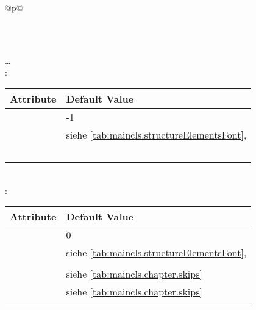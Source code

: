   \begin{longtable}{@{}p{\columnwidth}@{}}
    \caption{Default of the headings of  and
      }%
    \label{tab:maincls.section.defaults}\\
    \endfirsthead
    \caption[]{Default of the headings of  and
       \emph{(Continuation)}}\\
    \addlinespace[-\normalbaselineskip]
    \endhead
    \raggedleft\dots\\
    \endfoot
    \endlastfoot
    : \\*
    \begin{tabularx}{\linewidth}{ll}
    \toprule
    Attribute & Default Value \\
    \midrule
    \PValue{level}       & -1 \\
    \PValue{font}        & siehe \autoref{tab:maincls.structureElementsFont}, 
                           \autopageref{tab:maincls.structureElementsFont} \\
    \PValue{indent}      & \PValue{0pt} \\
    \PValue{beforeskip}  & \PValue{0pt plus 1fil + \Length{baselineskip}} \\
    \PValue{afterskip}   & \PValue{0pt plus 1fil} \\
    \PValue{tocindent}   & \PValue{0pt} \\
    \PValue{tocnumwidth} & \PValue{2em} \\
    \bottomrule
    \end{tabularx} \\
    \addlinespace[\normalbaselineskip]
    : \\*
    \begin{tabularx}{\linewidth}{ll}
    \toprule
    Attribute & Default Value \\
    \midrule
    \PValue{level}       & 0 \\
    \PValue{font}        & siehe \autoref{tab:maincls.structureElementsFont}, 
                           \autopageref{tab:maincls.structureElementsFont} \\
    \PValue{indent}      & \PValue{0pt} \\
    \PValue{beforeskip}  & siehe \autoref{tab:maincls.chapter.skips} \\
    \PValue{afterskip}   & siehe \autoref{tab:maincls.chapter.skips} \\
    \PValue{tocindent}   & \PValue{0pt} \\

\end{tabularx}
\end{longtable}
